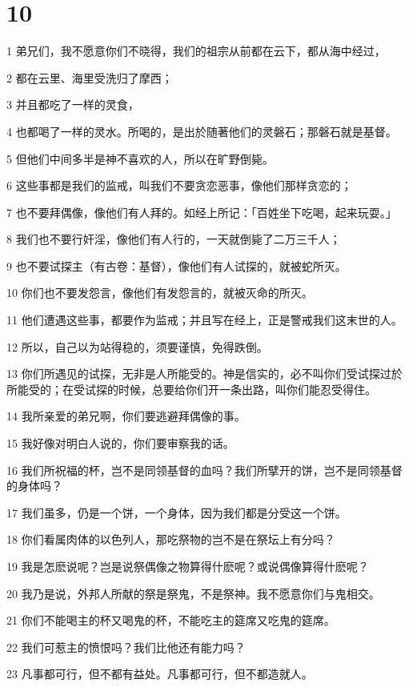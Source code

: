 \chapter{10}

\par 1 弟兄们，我不愿意你们不晓得，我们的祖宗从前都在云下，都从海中经过，
\par 2 都在云里、海里受洗归了摩西；
\par 3 并且都吃了一样的灵食，
\par 4 也都喝了一样的灵水。所喝的，是出於随著他们的灵磐石；那磐石就是基督。
\par 5 但他们中间多半是神不喜欢的人，所以在旷野倒毙。
\par 6 这些事都是我们的监戒，叫我们不要贪恋恶事，像他们那样贪恋的；
\par 7 也不要拜偶像，像他们有人拜的。如经上所记：「百姓坐下吃喝，起来玩耍。」
\par 8 我们也不要行奸淫，像他们有人行的，一天就倒毙了二万三千人；
\par 9 也不要试探主（有古卷：基督），像他们有人试探的，就被蛇所灭。
\par 10 你们也不要发怨言，像他们有发怨言的，就被灭命的所灭。
\par 11 他们遭遇这些事，都要作为监戒；并且写在经上，正是警戒我们这末世的人。
\par 12 所以，自己以为站得稳的，须要谨慎，免得跌倒。
\par 13 你们所遇见的试探，无非是人所能受的。神是信实的，必不叫你们受试探过於所能受的；在受试探的时候，总要给你们开一条出路，叫你们能忍受得住。
\par 14 我所亲爱的弟兄啊，你们要逃避拜偶像的事。
\par 15 我好像对明白人说的，你们要审察我的话。
\par 16 我们所祝福的杯，岂不是同领基督的血吗？我们所擘开的饼，岂不是同领基督的身体吗？
\par 17 我们虽多，仍是一个饼，一个身体，因为我们都是分受这一个饼。
\par 18 你们看属肉体的以色列人，那吃祭物的岂不是在祭坛上有分吗？
\par 19 我是怎麽说呢？岂是说祭偶像之物算得什麽呢？或说偶像算得什麽呢？
\par 20 我乃是说，外邦人所献的祭是祭鬼，不是祭神。我不愿意你们与鬼相交。
\par 21 你们不能喝主的杯又喝鬼的杯，不能吃主的筵席又吃鬼的筵席。
\par 22 我们可惹主的愤恨吗？我们比他还有能力吗？
\par 23 凡事都可行，但不都有益处。凡事都可行，但不都造就人。
